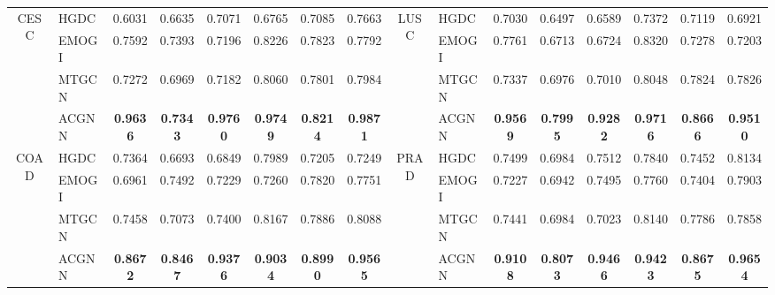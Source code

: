 \begin{table*}[h]
\begin{tabular}{c l ccc ccc  c l ccc ccc}
		\midrule
		\multirow{4}{*}{CESC} & HGDC & 0.6031 & 0.6635 & 0.7071 & 0.6765 & 0.7085 & 0.7663  & 
		\multirow{4}{*}{LUSC} & HGDC & 0.7030 & 0.6497 & 0.6589 & 0.7372 & 0.7119 & 0.6921 \\
		& EMOGI & 0.7592 & 0.7393 & 0.7196 & 0.8226 & 0.7823 & 0.7792 & 
		& EMOGI & 0.7761 & 0.6713 & 0.6724 & 0.8320 & 0.7278 & 0.7203 \\
		& MTGCN & 0.7272& 0.6969 & 0.7182 & 0.8060 & 0.7801 & 0.7984  & 
		& MTGCN & 0.7337& 0.6976 & 0.7010 & 0.8048 & 0.7824 & 0.7826 \\
		& ACGNN  & \textbf{0.9636}  & \textbf{0.7343}  & \textbf{0.9760}  & \textbf{0.9749}  & \textbf{0.8214}  & \textbf{0.9871}  & 
		& ACGNN  & \textbf{0.9569}  & \textbf{0.7995}  & \textbf{0.9282}  & \textbf{0.9716}  & \textbf{0.8666}  & \textbf{0.9510}  \\
		\midrule
		\multirow{4}{*}{COAD} & HGDC & 0.7364 & 0.6693 & 0.6849 & 0.7989 & 0.7205 & 0.7249 & 
		\multirow{4}{*}{PRAD} & HGDC & 0.7499 & 0.6984 & 0.7512 & 0.7840 & 0.7452 & 0.8134 \\
		& EMOGI & 0.6961 & 0.7492 & 0.7229 & 0.7260 & 0.7820 & 0.7751  & 
		& EMOGI & 0.7227 & 0.6942& 0.7495 & 0.7760 & 0.7404 & 0.7903 \\
		& MTGCN & 0.7458 & 0.7073 & 0.7400 & 0.8167 & 0.7886 & 0.8088  & 
		& MTGCN & 0.7441 & 0.6984 & 0.7023& 0.8140 & 0.7786 & 0.7858 \\
		& ACGNN  & \textbf{0.8672}  & \textbf{0.8467}  & \textbf{0.9376}  & \textbf{0.9034}  & \textbf{0.8990}  & \textbf{0.9565} & 
		& ACGNN  & \textbf{0.9108}  & \textbf{0.8073}  & \textbf{0.9466}  & \textbf{0.9423}  & \textbf{0.8675}  & \textbf{0.9654}  \\
		

\end{tabular}
\end{table*}
